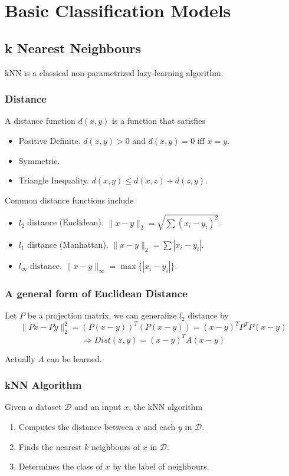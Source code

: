 \chapter{Basic Classification Models}
\newpage


\section{k Nearest Neighbours}
    kNN is a classical non-parametrized lazy-learning algorithm.

    \subsection{Distance}
        A distance function $d(x,y)$ is a function that satisfies
        \begin{itemize}
            \item Positive Definite. $d(x,y)>0$ and $d(x,y)=0$ iff $x=y$.
            \item Symmetric.
            \item Triangle Inequality. $d(x,y) \le d(x,z) + d(z,y)$.
        \end{itemize}
        Common distance functions include
        \begin{itemize}
            \item $l_2$ distance (Euclidean). $\|x-y\|_2 = \sqrt{\sum(x_i - y_i)^2}$.
            \item $l_1$ distance (Manhattan). $\|x-y\|_2 = \sum |x_i-y_i|$.
            \item $l_{\infty}$ distance. $\|x-y\|_{\infty} = \max\{|x_i-y_i|\}$.
        \end{itemize}

    \subsection{A general form of Euclidean Distance}
        Let $P$ be a projection matrix, we can generalize $l_2$ distance by
        \[\|Px-Py\|_2^2 = (P(x-y))^T(P(x-y)) = (x-y)^TP^TP(x-y)\]
        \[\Rightarrow Dist(x,y) = (x-y)^TA(x-y)\]
        \begin{remark}
            Actually $A$ can be learned.
        \end{remark}

    \subsection{kNN Algorithm}
        Given a dataset $\mathcal{D}$ and an input $x$, the kNN algorithm
        \begin{enumerate}
            \item Computes the distance between $x$ and each $y$ in $\mathcal{D}$.
            \item Finds the nearest $k$ neighbours of $x$ in $\mathcal{D}$.
            \item Determines the class of $x$ by the label of neighbours.
        \end{enumerate}

